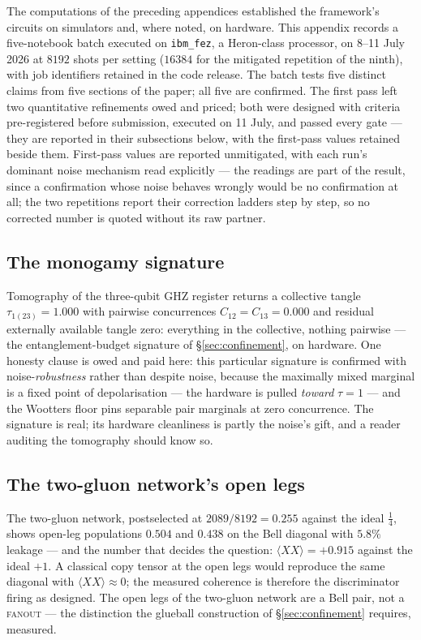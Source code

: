 The computations of the preceding appendices established the framework's circuits on simulators
and, where noted, on hardware. This appendix records a five-notebook batch executed on
\texttt{ibm\_fez}, a Heron-class processor, on 8--11 July 2026 at $8192$ shots per setting
($16384$ for the mitigated repetition of the ninth), with job identifiers retained in the code
release. The batch tests five distinct claims from five sections of the paper; all five are
confirmed. The first pass left two quantitative refinements owed and priced; both were designed
with criteria pre-registered before submission, executed on 11 July, and passed every gate ---
they are reported in their subsections below, with the first-pass values retained beside them.
First-pass values are reported unmitigated, with each run's dominant noise mechanism read
explicitly --- the readings are part of the result, since a confirmation whose noise behaves
wrongly would be no confirmation at all; the two repetitions report their correction ladders step
by step, so no corrected number is quoted without its raw partner.

\subsection{The monogamy signature}
\label{app:hw-monogamy}

Tomography of the three-qubit GHZ register returns a collective tangle
$\tau_{1(23)} = 1.000$ with pairwise concurrences $C_{12} = C_{13} = 0.000$ and residual
externally available tangle zero: everything in the collective, nothing pairwise --- the
entanglement-budget signature of \S\ref{sec:confinement}, on hardware. One honesty clause is owed
and paid here: this particular signature is confirmed with noise-\emph{robustness} rather than
despite noise, because the maximally mixed marginal is a fixed point of depolarisation --- the
hardware is pulled \emph{toward} $\tau = 1$ --- and the Wootters floor pins separable pair
marginals at zero concurrence. The signature is real; its hardware cleanliness is partly the
noise's gift, and a reader auditing the tomography should know so.

\subsection{The two-gluon network's open legs}
\label{app:hw-two-gluon}

The two-gluon network, postselected at $2089/8192 = 0.255$ against the ideal $\tfrac14$, shows
open-leg populations $0.504$ and $0.438$ on the Bell diagonal with $5.8\%$ leakage --- and the
number that decides the question: $\langle XX \rangle = +0.915$ against the ideal $+1$. A
classical copy tensor at the open legs would reproduce the same diagonal with
$\langle XX \rangle \approx 0$; the measured coherence is therefore the discriminator firing as
designed. The open legs of the two-gluon network are a Bell pair, not a \textsc{fanout} --- the
distinction the glueball construction of \S\ref{sec:confinement} requires, measured.


